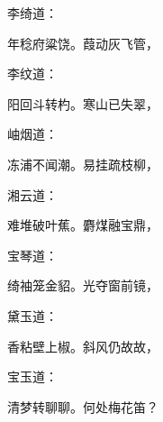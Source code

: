 \begin{parag}
    李绮道：
\end{parag}
\begin{poem}
    \begin{pl} 年稔府粱饶。葭动灰飞管，\end{pl}
\end{poem}


\begin{parag}
    李纹道：
\end{parag}
\begin{poem}
    \begin{pl} 阳回斗转杓。寒山已失翠，\end{pl}
\end{poem}


\begin{parag}
    岫烟道：
\end{parag}
\begin{poem}
    \begin{pl} 冻浦不闻潮。易挂疏枝柳，\end{pl}
\end{poem}


\begin{parag}
    湘云道：
\end{parag}
\begin{poem}
    \begin{pl} 难堆破叶蕉。麝煤融宝鼎，\end{pl}
\end{poem}


\begin{parag}
    宝琴道：
\end{parag}
\begin{poem}
    \begin{pl} 绮袖笼金貂。光夺窗前镜，\end{pl}
\end{poem}


\begin{parag}
    黛玉道：
\end{parag}
\begin{poem}
    \begin{pl} 香粘壁上椒。斜风仍故故，\end{pl}
\end{poem}


\begin{parag}
    宝玉道：
\end{parag}
\begin{poem}
    \begin{pl} 清梦转聊聊。何处梅花笛？\end{pl}
\end{poem}


